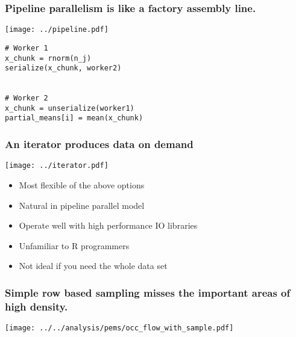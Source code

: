 \documentclass{beamer}
\begin{document}
\begin{frame}[fragile]

    \frametitle{Pipeline parallelism is like a factory assembly line.}

\centerline{\texttt{[image: ../pipeline.pdf]}}

\begin{verbatim}
# Worker 1
x_chunk = rnorm(n_j)
serialize(x_chunk, worker2)


# Worker 2
x_chunk = unserialize(worker1)
partial_means[i] = mean(x_chunk)
\end{verbatim}

\end{frame}
\begin{frame}

    \frametitle{An iterator produces data on demand}

    \centerline{\texttt{[image: ../iterator.pdf]}}

    \begin{itemize}
        \item Most flexible of the above options
        \item Natural in pipeline parallel model
        \item Operate well with high performance IO libraries
    \end{itemize}


    \begin{itemize}
        \item Unfamiliar to R programmers
        \item Not ideal if you need the whole data set
    \end{itemize}


\end{frame}
\begin{frame}

    \frametitle{Simple row based sampling misses the important areas of high
    density.}

    \centerline{\texttt{[image: ../../analysis/pems/occ\_flow\_with\_sample.pdf]}}



\end{frame}
\end{document}
